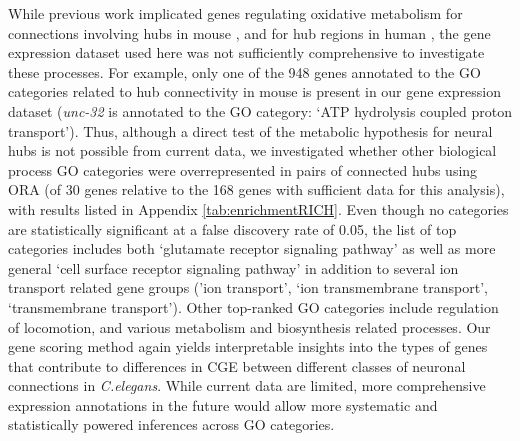 {While previous work implicated genes regulating oxidative metabolism for connections involving hubs in mouse \citep{Fulcher2016}, and for hub regions in human \citep{Vertes2016b}, the gene expression dataset used here was not sufficiently comprehensive to investigate these processes.
For example, only one of the 948 genes annotated to the GO categories related to hub connectivity in mouse is present in our gene expression dataset (\emph{unc-32} is annotated to the GO category: `ATP hydrolysis coupled proton transport').
Thus, although a direct test of the metabolic hypothesis for neural hubs is not possible from current data, we investigated whether other biological process GO categories were overrepresented in pairs of connected hubs using ORA (of 30 genes relative to the 168 genes with sufficient data for this analysis), with results listed in Appendix \ref{tab:enrichmentRICH}.
Even though no categories are statistically significant at a false discovery rate of 0.05, the list of top categories includes both `glutamate receptor signaling pathway' as well as more general `cell surface receptor signaling pathway' in addition to several ion transport related gene groups ('ion transport', `ion transmembrane transport', `transmembrane transport').
Other top-ranked GO categories include regulation of locomotion, and various metabolism and biosynthesis related processes.
Our gene scoring method again yields interpretable insights into the types of genes that contribute to differences in CGE between different classes of neuronal connections in \emph{C.elegans}.
While current data are limited, more comprehensive expression annotations in the future would allow more systematic and statistically powered inferences across GO categories.

}
